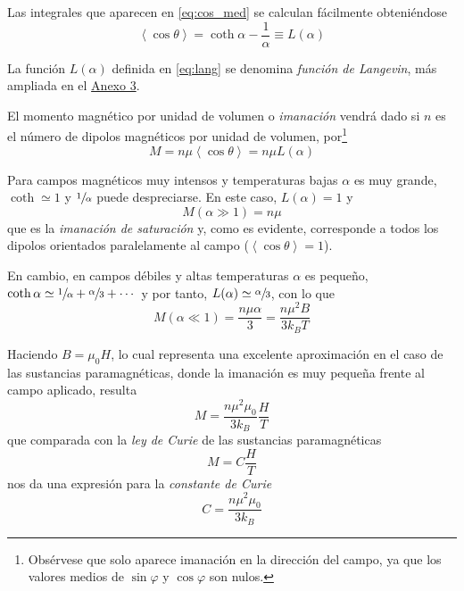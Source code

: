 Las integrales que aparecen en \eqref{eq:cos_med} se calculan fácilmente obteniéndose
\begin{equation}\label{eq:lang}
	\left\langle \cos \theta \right\rangle = \coth \alpha - \frac{1}{\alpha} \equiv L(\alpha)
\end{equation}

La función $L(\alpha)$ definida en \eqref{eq:lang} se denomina \emph{función de Langevin}, más ampliada en el \hyperref[Anx3]{Anexo 3}.

El momento magnético por unidad de volumen o \emph{imanación} vendrá dado si $n$ es el número de dipolos magnéticos por unidad de volumen, por\footnote{Obsérvese que solo aparece imanación en la dirección del campo, ya que los valores medios de $\sin \varphi$ y $\cos \varphi$ son nulos.}
\begin{equation}
	 M = n\mu \left\langle \cos \theta \right\rangle = n\mu L(\alpha)
\end{equation}

Para campos magnéticos muy intensos y temperaturas bajas $\alpha$ es muy grande, $\coth \simeq 1$ y $\sfrac{1}{\alpha}$ puede despreciarse.
En este caso, $L(\alpha) = 1$ y
\begin{equation}
	M(\alpha \gg 1) = n\mu
\end{equation}
que es la \emph{imanación de saturación} y, como es evidente, corresponde a todos los dipolos orientados paralelamente al campo ($	\left\langle \cos \theta \right\rangle = 1$).

En cambio, en campos débiles y altas temperaturas $\alpha$ es pequeño, $\coth \alpha \simeq \sfrac{1}{\alpha} + \sfrac{\alpha}{3} + \cdots$ y por tanto, $L(\alpha) \simeq \sfrac{\alpha}{3}$, con lo que
\begin{equation}
	M(\alpha \ll 1) = \frac{n\mu\alpha}{3} = \frac{n\mu^ 2B}{3 k_B T}
\end{equation}

Haciendo $B = \mu_0 H$, lo cual representa una excelente aproximación en el caso de las sustancias paramagnéticas, donde la imanación es muy pequeña frente al campo aplicado, resulta
\begin{equation}
	M = \frac{n\mu^2\mu_0}{3 k_B}\frac{H}{T}
\end{equation}
que comparada con la \emph{ley de Curie} de las sustancias paramagnéticas
\begin{equation}
	M = C\frac{H}{T}
\end{equation}
nos da una expresión para la \emph{constante de Curie}
\begin{equation}
	C = \frac{n\mu^2\mu_0}{3 k_B}
\end{equation}

